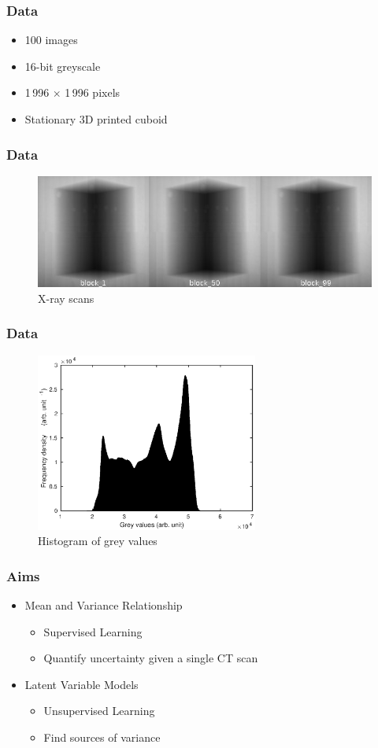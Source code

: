 \documentclass{beamer}
\begin{document}
\begin{frame}
\frametitle{Data}
\begin{itemize}
	\item 100 images
	\item 16-bit greyscale
	\item 1\,996 $\times$ 1\,996 pixels
	\item Stationary 3D printed cuboid
\end{itemize}
\end{frame}

\begin{frame}
\frametitle{Data}
\begin{figure}
	\includegraphics[width = \textwidth]{figures/block_montage.jpg}
	\caption{X-ray scans}
\end{figure}
\end{frame}

\begin{frame}
\frametitle{Data}
\begin{figure}
	\includegraphics[width = 0.65\textwidth]{figures/block_histogram.eps}
	\caption{Histogram of grey values}
\end{figure}
\end{frame}

\begin{frame}
\frametitle{Aims}
\begin{itemize}
	\item Mean and Variance Relationship
		\begin{itemize}
			\item Supervised Learning
			\item Quantify uncertainty given a single CT scan
		\end{itemize}
	\item Latent Variable Models
		\begin{itemize}
			\item Unsupervised Learning
			\item Find sources of variance
		\end{itemize}
\end{itemize}
\end{frame}
\end{document}
